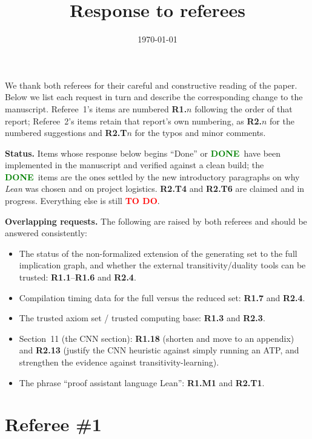 \documentclass[11pt]{amsart}
\title{Response to referees}
\author{}
\date{\today}
\newcommand{\todo}{\textcolor{red}{\textbf{TO DO}}}
\newcommand{\done}{\textcolor{green}{\textbf{DONE}}}
\newcommand{\rlabel}{R}
\begin{document}
\maketitle

\noindent
We thank both referees for their careful and constructive reading of the paper.
Below we list each request in turn and describe the corresponding change to the
manuscript. Referee~1's items are numbered \textbf{R1.$n$} following the order of
that report; Referee~2's items retain that report's own numbering, as
\textbf{R2.$n$} for the numbered suggestions and \textbf{R2.T$n$} for the typos and
minor comments.

\medskip

\noindent
\textbf{Status.} Items whose response below begins ``Done'' or \done\ have been implemented in
the manuscript and verified against a clean build; the \done\ items are the ones
settled by the new introductory paragraphs on why \emph{Lean} was chosen and on
project logistics. \textbf{R2.T4} and \textbf{R2.T6} are
claimed and in progress. Everything else is still \todo.

\noindent
\textbf{Overlapping requests.} The following are raised by both referees and should
be answered consistently:
\begin{itemize}[leftmargin=2em, itemsep=0.3em]
  \item The status of the non-formalized extension of the generating set to the full
        implication graph, and whether the external transitivity/duality tools can be
        trusted: \textbf{R1.1}--\textbf{R1.6} and \textbf{R2.4}.
  \item Compilation timing data for the full versus the reduced set:
        \textbf{R1.7} and \textbf{R2.4}.
  \item The trusted axiom set / trusted computing base: \textbf{R1.3} and \textbf{R2.3}.
  \item Section~11 (the CNN section): \textbf{R1.18} (shorten and move to an appendix)
        and \textbf{R2.13} (justify the CNN heuristic against simply running an ATP,
        and strengthen the evidence against transitivity-learning).
  \item The phrase ``proof assistant language Lean'': \textbf{R1.M1} and \textbf{R2.T1}.
\end{itemize}

\section*{Referee \#1}
\renewcommand{\rlabel}{R1}
\end{document}
